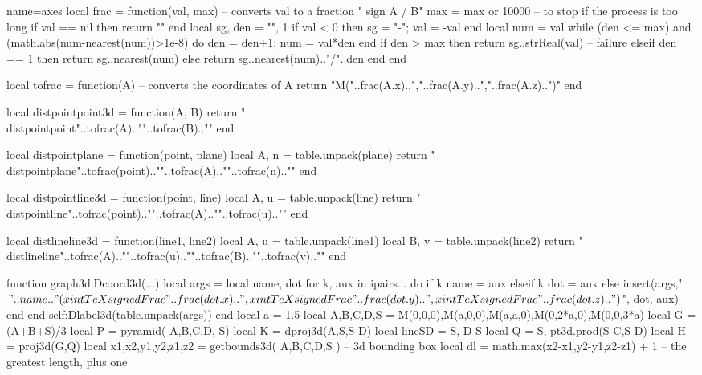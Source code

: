 \documentclass{standalone}
\def\distpointpoint#1#2{%
\begin{CAS}
vars('y')
local A, B = #1, #2
local d = (B.x-A.x)^2+(B.y-A.y)^2+(B.z-A.z)^2
local a = simplify( SqrtExpression( d, 2 ) )
tex.print(a:tolatex())
\end{CAS}
}%
\def\distpointplane#1#2#3{%
\begin{CAS}
vars('y')
local A, B, n = #1, #2, #3
local d = ( (B.x-A.x)*n.x + (B.y-A.y)*n.y + (B.z-A.z)*n.z)^2 / (n.x^2+n.y^2+n.z^2)
local a = simplify( SqrtExpression( d, 2 ) )
tex.print(a:tolatex())
\end{CAS}
}%
\def\distpointline#1#2#3{%
\begin{CAS}
vars('y')
local A, B, v = #1, #2, #3
local u = M(A.x-B.x,A.y-B.y,A.z-B.z)
local n = M(u.y*v.z-v.y*u.z, u.z*v.x-v.z*u.x, u.x*v.y-v.x*u.y)
local d = (n.x^2+n.y^2+n.z^2) / (v.x^2+v.y^2+v.z^2)
local a = simplify( SqrtExpression( d, 2 ) )
tex.print(a:tolatex())
\end{CAS}
}%
\def\distlineline#1#2#3#4{%
\begin{CAS}
vars('y')
local A, u, B, v = #1, #2, #3, #4
local n = M( u.y*v.z-v.y*u.z, u.z*v.x-v.z*u.x, u.x*v.y-v.x*u.y)
local d =  ((B.x-A.x)*n.x+(B.y-A.y)*n.y+(B.z-A.z)*n.z)^2 / (n.x^2+n.y^2+n.z^2)
local a = simplify( SqrtExpression( d, 2 ) )
tex.print(a:tolatex())
\end{CAS}
}%
\begin{document}
\begin{luadraw}{name=axes}
local frac = function(val, max)  -- converts val to a fraction " sign A / B"
    max = max or 10000 -- to stop if the process is too long
    if val == nil then return "" end
    local sg, den =  "", 1
    if val < 0 then sg = "-"; val = -val end
    local num = val
    while (den <= max) and (math.abs(num-nearest(num))>1e-8) do den = den+1; num = val*den end
    if den > max then 
        return sg..strReal(val) -- failure
    elseif den == 1 then
        return sg..nearest(num)
    else
        return sg..nearest(num).."/"..den
    end
end

local tofrac = function(A) -- converts the coordinates of A
    return "M("..frac(A.x)..","..frac(A.y)..","..frac(A.z)..")"
end

local distpointpoint3d = function(A, B)
    return "\\distpointpoint{"..tofrac(A).."}{"..tofrac(B).."}"
end

local distpointplane = function(point, plane)
    local A, n = table.unpack(plane)
    return "\\distpointplane{"..tofrac(point).."}{"..tofrac(A).."}{"..tofrac(n).."}"
end

local distpointline3d = function(point, line)
    local A, u = table.unpack(line)
    return "\\distpointline{"..tofrac(point).."}{"..tofrac(A).."}{"..tofrac(u).."}"
end

local distlineline3d = function(line1, line2)
    local A, u = table.unpack(line1)
    local B, v = table.unpack(line2)
    return "\\distlineline{"..tofrac(A).."}{"..tofrac(u).."}{"..tofrac(B).."}{"..tofrac(v).."}"
end

function graph3d:Dcoord3d(...)
    local args = {}
    local name, dot
    for k, aux in ipairs{...} do
        if k%
            name = aux
        elseif k%
            dot = aux
        else
            insert(args,{"$"..name.."(\\xintTeXsignedFrac {"..frac(dot.x).."},\\xintTeXsignedFrac {"..frac(dot.y).."},\\xintTeXsignedFrac {"..frac(dot.z).."})$", dot, aux})
        end
    end
    self:Dlabel3d(table.unpack(args))
end
local a = 1.5
local A,B,C,D,S = M(0,0,0),M(a,0,0),M(a,a,0),M(0,2*a,0),M(0,0,3*a)
local G = (A+B+S)/3
local P = pyramid( {A,B,C,D}, S)
local K = dproj3d(A,{S,S-D})
local lineSD = {S, D-S} 
local Q = {S, pt3d.prod(S-C,S-D)}
local H = proj3d(G,Q)
local x1,x2,y1,y2,z1,z2 = getbounds3d( {A,B,C,D,S} ) -- 3d bounding box
local dl = math.max(x2-x1,y2-y1,z2-z1) + 1 -- the greatest length, plus one


\end{luadraw}
\end{document}
